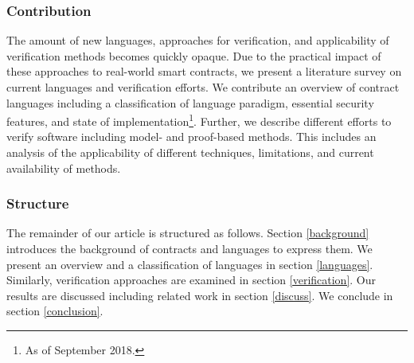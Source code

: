 \subsubsection{Contribution} The amount of new languages, approaches for verification, and applicability of verification methods becomes quickly opaque. Due to the practical impact of these approaches to real-world smart contracts, we present a literature survey on current languages and verification efforts.
We contribute an overview of contract languages including a classification of language paradigm, essential security features, and state of implementation\footnote{As of September 2018.}.
Further, we describe different efforts to verify software including model- and proof-based methods. This includes an analysis of the applicability of different techniques, limitations, and current availability of methods.

\subsubsection{Structure} The remainder of our article is structured as follows. Section \ref{background} introduces the background of contracts and languages to express them. We present an overview and a classification of languages in section \ref{languages}. Similarly, verification approaches are examined in section \ref{verification}. Our results are discussed including related work in section \ref{discuss}. We conclude in section \ref{conclusion}.
